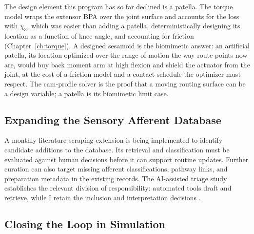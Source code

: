 The design element this program has so far declined is a patella. The torque model wraps the extensor BPA over the joint surface and accounts for the loss with $\chi_{3}$, which was easier than adding a patella, deterministically designing its location as a function of knee angle, and accounting for friction (Chapter~\ref{ch:torque}). A designed sesamoid is the biomimetic answer: an artificial patella, its location optimized over the range of motion the way route points now are, would buy back moment arm at high flexion and shield the actuator from the joint, at the cost of a friction model and a contact schedule the optimizer must respect. The cam-profile solver is the proof that a moving routing surface can be a design variable; a patella is its biomimetic limit case.

\subsection{Expanding the Sensory Afferent Database}\label{sec:fw_database}

A monthly literature-scraping extension is being implemented to identify candidate additions to the database. Its retrieval and classification must be evaluated against human decisions before it can support routine updates. Further curation can also target missing afferent classifications, pathway links, and preparation metadata in the existing records. The AI-assisted triage study establishes the relevant division of responsibility: automated tools draft and retrieve, while I retain the inclusion and interpretation decisions \citep{bolen_using_2024}.

\subsection{Closing the Loop in Simulation}\label{sec:fw_pipeline}\label{sec:fw_cpg}

